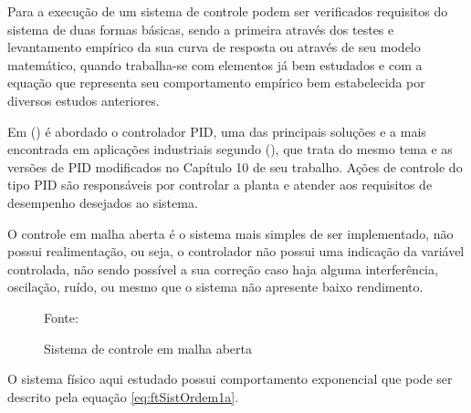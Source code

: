 Para a execução de um sistema de controle podem ser verificados requisitos do sistema de duas formas básicas, sendo a primeira através dos testes e levantamento empírico da sua curva de resposta ou através de seu modelo matemático, quando trabalha-se com elementos já bem estudados e com a equação que representa seu comportamento empírico bem estabelecida por diversos estudos anteriores.


Em \citeauthor{dorf2011modern}(\citeyear{dorf2011modern}) 
é abordado o controlador PID, uma das principais soluções e a mais encontrada em aplicações industriais segundo \citeauthor{Ogata}(\citeyear{Ogata}), que trata do mesmo tema e as versões de PID modificados no Capítulo 10 de seu trabalho. 
Ações de controle do tipo PID são responsáveis por controlar a planta e atender aos requisitos de desempenho desejados ao sistema.






O controle em malha aberta é o sistema mais simples de ser implementado, não possui realimentação, ou seja, o controlador não possui uma indicação da variável controlada, não sendo possível a sua correção caso haja alguma interferência, oscilação, ruído, ou mesmo que o sistema não apresente baixo rendimento.

\begin{figure}[!htb]
\centering
\caption{ Sistema de controle em malha aberta}
\label{fig:AcaoMalhaAberta}

{\small Fonte: \cite{Ogata}}
\end{figure}

O sistema físico aqui estudado possui comportamento exponencial que pode ser descrito pela equação \ref{eq:ftSistOrdem1a}. 




